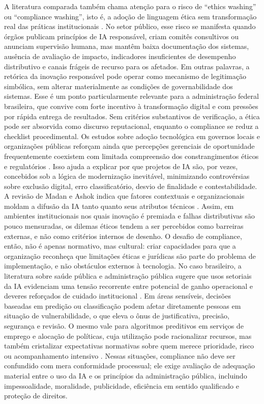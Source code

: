 \documentclass[12pt,a4paper]{article}
\begin{document}
A literatura comparada também chama atenção para o risco de “ethics washing” ou “compliance washing”, isto é, a adoção de linguagem ética sem transformação real das práticas institucionais \autocite{batool2025ai} \autocite{sigfrids2022how}. No setor público, esse risco se manifesta quando órgãos publicam princípios de IA responsável, criam comitês consultivos ou anunciam supervisão humana, mas mantêm baixa documentação dos sistemas, ausência de avaliação de impacto, indicadores insuficientes de desempenho distributivo e canais frágeis de recurso para os afetados. Em outras palavras, a retórica da inovação responsável pode operar como mecanismo de legitimação simbólica, sem alterar materialmente as condições de governabilidade dos sistemas. Esse é um ponto particularmente relevante para a administração federal brasileira, que convive com forte incentivo à transformação digital e com pressões por rápida entrega de resultados. Sem critérios substantivos de verificação, a ética pode ser absorvida como discurso reputacional, enquanto o compliance se reduz a checklist procedimental.
Os estudos sobre adoção tecnológica em governos locais e organizações públicas reforçam ainda que percepções gerenciais de oportunidade frequentemente coexistem com limitada compreensão dos constrangimentos éticos e regulatórios \autocite{yiitcanlar2022artificial} \autocite{david2023understanding}. Isso ajuda a explicar por que projetos de IA são, por vezes, concebidos sob a lógica de modernização inevitável, minimizando controvérsias sobre exclusão digital, erro classificatório, desvio de finalidade e contestabilidade. A revisão de Madan e Ashok indica que fatores contextuais e organizacionais moldam a difusão da IA tanto quanto seus atributos técnicos \autocite{madan2022ai}. Assim, em ambientes institucionais nos quais inovação é premiada e falhas distributivas são pouco mensuradas, os dilemas éticos tendem a ser percebidos como barreiras externas, e não como critérios internos de desenho. O desafio de compliance, então, não é apenas normativo, mas cultural: criar capacidades para que a organização reconheça que limitações éticas e jurídicas são parte do problema de implementação, e não obstáculos externos à tecnologia.
No caso brasileiro, a literatura sobre saúde pública e administração pública sugere que usos setoriais da IA evidenciam uma tensão recorrente entre potencial de ganho operacional e deveres reforçados de cuidado institucional \autocite{lemes2020o} \autocite{serra2024a}. Em áreas sensíveis, decisões baseadas em predição ou classificação podem afetar diretamente pessoas em situação de vulnerabilidade, o que eleva o ônus de justificativa, precisão, segurança e revisão. O mesmo vale para algoritmos preditivos em serviços de emprego e alocação de políticas, cuja utilização pode racionalizar recursos, mas também cristalizar expectativas normativas sobre quem merece prioridade, risco ou acompanhamento intensivo \autocite{krtner2021predictive}. Nessas situações, compliance não deve ser confundido com mera conformidade processual; ele exige avaliação de adequação material entre o uso da IA e os princípios da administração pública, incluindo impessoalidade, moralidade, publicidade, eficiência em sentido qualificado e proteção de direitos.
\end{document}

